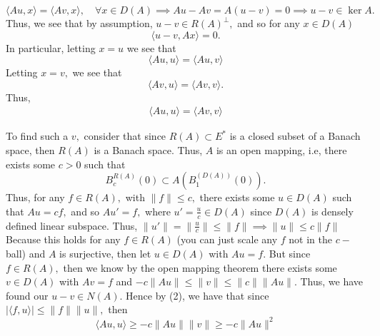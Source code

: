 \documentclass[11pt]{article}
\begin{document}
\begin{problem}
\begin{enumerate}
\begin{solution}
        \[\langle Au, x\rangle = \langle Av, x\rangle, \quad \forall x\in D(A) \implies Au- Av = A(u-v) = 0 \implies u-v \in \ker A.\] Thus, we see that by assumption, $u-v \in R(A)^\perp,$ and so for any $x\in D(A)$
        \[\langle u-v, Ax \rangle = 0.\]
        In particular, letting $x = u$ we see that 
        \[\langle Au, u\rangle = \langle Au, v\rangle\]
        Letting $x = v,$ we see that 
        \[\langle Av, u\rangle = \langle Av, v\rangle.\]
        Thus, 
        \begin{align}
        \langle Au, u \rangle= \langle Av,v\rangle    
        \end{align}
        

        To find such a $v,$ consider that since $R(A)\subset E^*$ is a closed subset of a Banach space, then $R(A)$ is a Banach space. Thus, $A$ is an open mapping, i.e, there exists some $c >0$ such that
        \[B_c^{R(A)}(0)\subset A(B_1^{(D(A))}(0)).\] Thus, for any $f \in R(A),$ with $\|f\|\leq c,$ there exists some $u \in D(A)$ such that $Au = cf,$ and so $Au' = f,$ where $u' = \frac{u}{c}\in D(A)$ since $D(A)$ is densely defined linear subspace.  Thus, $\|u'\| = \|\frac{u}{c}\| \leq \|f\|\implies \|u\|\leq c\|f\|$ Because this holds for any $f\in R(A)$ (you can just scale any $f$ not in the $c-$ball) and $A$ is surjective, then let $u\in D(A)$ with $Au = f.$ But since $f\in R(A),$ then we know by the open mapping theorem there exists some $v\in D(A)$ with $Av = f$ and $-c \|Au\|\leq \|v\| \leq \|c\|\|Au\|.$ Thus, we have found our $u-v \in N(A).$ Hence by (2), we have that since $|\langle f, u\rangle|\leq \|f\|\|u\|,$ then 
        \[\langle Au, u \rangle \geq -c\|Au\|\|v\| \geq -c\|Au\|^2\]
    \end{solution}
    \end{enumerate}
\end{problem}

\newpage
\end{document}
